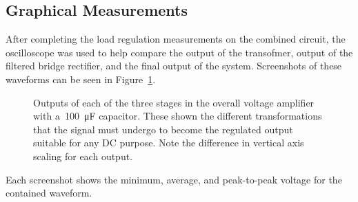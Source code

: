 \subsection{Graphical Measurements}
After completing the load regulation measurements on the combined circuit, the
oscilloscope was used to help compare the output of the transofmer, output of
the filtered bridge rectifier, and the final output of the system.  Screenshots
of these waveforms can be seen in Figure~\ref{fig:100uFshots}.
%
\begin{figure}[H]
	\centering
	\quad
	\quad

	\parbox{.9\textwidth}{
	\caption[Oscilloscope Screenshots --- Completed Circuit
	w/\SI{100}{\micro\farad} Capacitor]{Outputs of each of the three stages in
	the overall voltage amplifier with a~\SI{100}{\micro\farad} capacitor.
	These shown the different transformations that the signal must undergo to
	become the regulated output suitable for any DC purpose.  Note the
	difference in vertical axis scaling for each output.}
	\label{fig:100uFshots}
	}
\end{figure}
%
Each screenshot shows the minimum, average, and peak-to-peak voltage for the
contained waveform.

